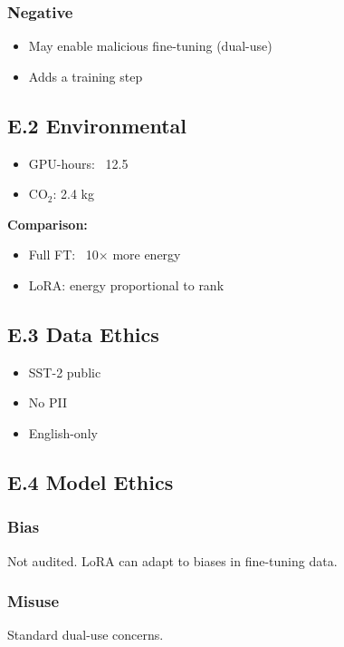 \subsubsection{Negative}
\begin{itemize}
\item May enable malicious fine-tuning (dual-use)
\item Adds a training step

\end{itemize}
\subsection{E.2 Environmental}

\begin{itemize}
\item GPU-hours: ~12.5
\item CO$_2$: 2.4 kg

\end{itemize}
\textbf{Comparison:}
\begin{itemize}
\item Full FT: ~10$\times$ more energy
\item LoRA: energy proportional to rank

\end{itemize}
\subsection{E.3 Data Ethics}

\begin{itemize}
\item SST-2 public
\item No PII
\item English-only

\end{itemize}
\subsection{E.4 Model Ethics}

\subsubsection{Bias}
Not audited. LoRA can adapt to biases in fine-tuning data.

\subsubsection{Misuse}
Standard dual-use concerns.

